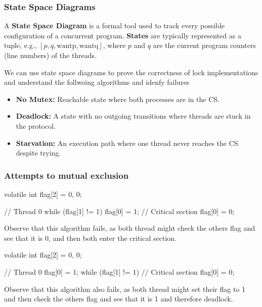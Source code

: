 \subsubsection{State Space Diagrams}

\begin{definition}
    A \textbf{State Space Diagram} is a formal tool used to track every possible configuration of a concurrent program.
    \textbf{States} are typically represented as a tuple, e.g., $[p, q, \text{wantp}, \text{wantq}]$, where $p$ and $q$ are the current program counters (line numbers) of the threads.
\end{definition}

\begin{remark}
    We can use state space diagrams to prove the correctness of lock implementations and understand the follwoing algorithms and idenfy failures
    \begin{itemize}
        \item \textbf{No Mutex:} Reachable state where both processes are in the CS.
        \item \textbf{Deadlock:} A state with no outgoing transitions where threads are stuck in the protocol.
        \item \textbf{Starvation:} An execution path where one thread never reaches the CS despite trying.
    \end{itemize}
\end{remark}

\subsubsection{Attempts to mutual exclusion}

\begin{algorithm}
volatile int flag[2] = {0, 0};

// Thread 0
while (flag[1] != 1) {}
flag[0] = 1;
// Critical section
flag[0] = 0;
\end{algorithm}

Observe that this algorithm fails, as both thread might check the others flag and see that it is 0, and then both enter the critical section.

\begin{algorithm}
volatile int flag[2] = {0, 0};

// Thread 0
flag[0] = 1;
while (flag[1] != 1) {}
// Critical section
flag[0] = 0;
\end{algorithm}

Observe that this algorithm also fails, as both thread might set their flag to 1 and then check the others flag and see that it is 1 and therefore deadlock.

